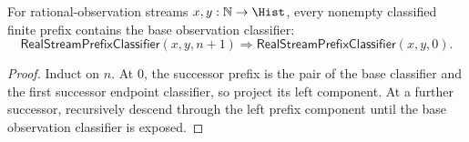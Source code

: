 \begin{theorem}
\label{thm:real-stream-prefix-classifier-base-of-successor}
For rational-observation streams $x,y:\mathbb{N}\to\Hist$, every nonempty
classified finite prefix contains the base observation classifier:
$$
\mathsf{RealStreamPrefixClassifier}(x,y,n+1)
\Longrightarrow
\mathsf{RealStreamPrefixClassifier}(x,y,0).
$$
\end{theorem}
\begin{proof}
Induct on $n$. At $0$, the successor prefix is the pair of the base classifier
and the first successor endpoint classifier, so project its left component. At
a further successor, recursively descend through the left prefix component until
the base observation classifier is exposed.
\end{proof}
